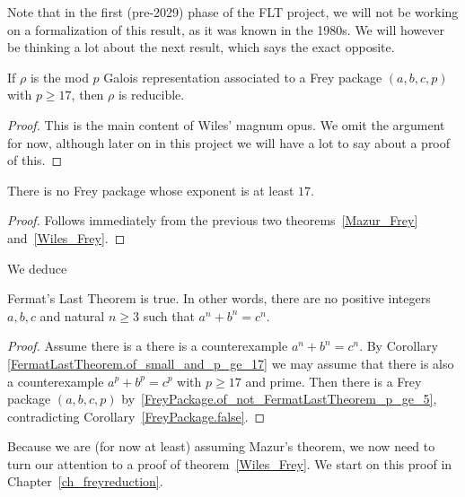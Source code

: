 Note that in the first (pre-2029) phase of the FLT project, we will not be working on
a formalization of this result, as it was known in the 1980s. We will however be thinking
a lot about the next result, which says the exact opposite.

\begin{theorem}
  \label{Wiles_Frey}
  \leanok
  If $\rho$ is the mod $p$ Galois representation associated to a Frey package $(a,b,c,p)$
  with $p\geq17$, then
  $\rho$ is reducible.
\end{theorem}
\begin{proof}
  This is the main content of Wiles' magnum opus.
  We omit the argument for now, although later on in this project
  we will have a lot to say about a proof of this.
\end{proof}

\begin{corollary}
  \label{FreyPackage.false}
  \leanok
  There is no Frey package whose exponent is at least $17$.
\end{corollary}
\begin{proof} Follows immediately from the previous two
  theorems~\ref{Mazur_Frey} and~\ref{Wiles_Frey}.
\end{proof}

We deduce

\begin{corollary}
  \label{FLT}
  \leanok
  Fermat's Last Theorem is true. In other words, there are no positive integers $a,b,c$ and
  natural $n\geq3$ such that $a^n+b^n=c^n$.
\end{corollary}
\begin{proof}
  Assume there is a there is a counterexample $a^n+b^n=c^n$.
  By Corollary \ref{FermatLastTheorem.of_small_and_p_ge_17} we may assume that there is also a
  counterexample $a^p+b^p=c^p$ with $p\geq 17$ and prime.
  Then there is a Frey package $(a,b,c,p)$ by~\ref{FreyPackage.of_not_FermatLastTheorem_p_ge_5},
  contradicting Corollary~\ref{FreyPackage.false}.
\end{proof}

Because we are (for now at least) assuming Mazur's theorem, we now need to turn our attention
to a proof of theorem~\ref{Wiles_Frey}. We start on this proof in Chapter~\ref{ch_freyreduction}.
